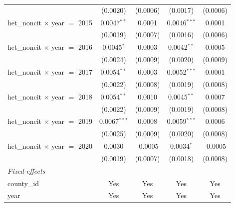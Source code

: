 \begin{tabular}{lcccc}
                                                    & (0.0020)           & (0.0006)                  & (0.0017)             & (0.0006)\\   
   het\_noncit $\times$ year $=$ 2015               & 0.0047$^{**}$      & 0.0001                    & 0.0046$^{***}$       & 0.0001\\   
                                                    & (0.0019)           & (0.0007)                  & (0.0016)             & (0.0006)\\   
   het\_noncit $\times$ year $=$ 2016               & 0.0045$^{*}$       & 0.0003                    & 0.0042$^{**}$        & 0.0005\\   
                                                    & (0.0024)           & (0.0009)                  & (0.0020)             & (0.0009)\\   
   het\_noncit $\times$ year $=$ 2017               & 0.0054$^{**}$      & 0.0003                    & 0.0052$^{***}$       & 0.0001\\   
                                                    & (0.0022)           & (0.0008)                  & (0.0019)             & (0.0008)\\   
   het\_noncit $\times$ year $=$ 2018               & 0.0054$^{**}$      & 0.0010                    & 0.0045$^{**}$        & 0.0007\\   
                                                    & (0.0022)           & (0.0009)                  & (0.0019)             & (0.0008)\\   
   het\_noncit $\times$ year $=$ 2019               & 0.0067$^{***}$     & 0.0008                    & 0.0059$^{***}$       & 0.0006\\   
                                                    & (0.0025)           & (0.0009)                  & (0.0020)             & (0.0008)\\   
   het\_noncit $\times$ year $=$ 2020               & 0.0030             & -0.0005                   & 0.0034$^{*}$         & -0.0005\\   
                                                    & (0.0019)           & (0.0007)                  & (0.0018)             & (0.0008)\\   
   \midrule
   \emph{Fixed-effects}\\
   county\_id                                       & Yes                & Yes                       & Yes                  & Yes\\  
   year                                             & Yes                & Yes                       & Yes                  & Yes\\  

\end{tabular}
